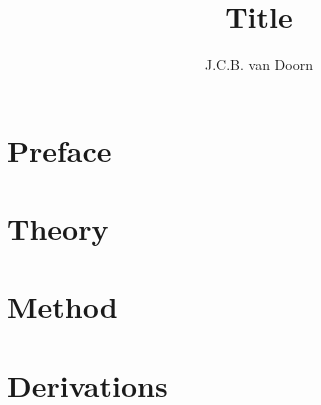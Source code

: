 \documentclass[twoside,single]{lion-msc}
\title{Title}
\author{J.C.B. van Doorn}
\begin{document}
	\maketitle

	\tableofcontents

	\chapter{Preface}
	

	\chapter{Theory}
	

	\chapter{Method}
	

	\appendix
	\chapter{Derivations}
	

	\printbibliography
\end{document}
